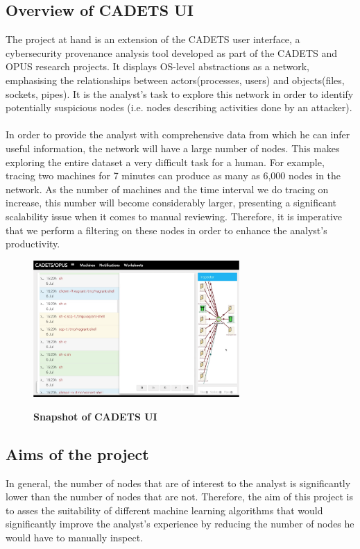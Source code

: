 	\subsection{Overview of CADETS UI}\label{1.1.1}
	The project at hand is an extension of the CADETS user interface, a cybersecurity provenance analysis tool developed as part of the CADETS and OPUS research projects. It displays OS-level abstractions as a network, emphasising the relationships between actors(processes, users) and objects(files, sockets, pipes). It is the analyst's task to explore this network in order to identify potentially suspicious nodes (i.e. nodes describing activities done by an attacker). 
	\\ \\
	In order to provide the analyst with comprehensive data from which he can infer useful information, the network will have a large number of nodes. This makes exploring the entire dataset a very difficult task for a human.  For example, tracing two machines for 7 minutes can produce as many as 6,000 nodes in the network. As the number of machines and the time interval we do tracing on increase, this number will become considerably larger, presenting a significant scalability issue when it comes to manual reviewing. Therefore, it is imperative that we perform a filtering on these nodes in order to enhance the analyst's productivity.
	\begin{figure}[H]
		\centering
		\includegraphics[width=0.7\textwidth]{graphics/CADETS}
		\label{Figure 1.1}
		\caption{\bf Snapshot of CADETS UI}
	\end{figure}
	
	\subsection{Aims of the project}
	In general, the number of nodes that are of interest to the analyst is significantly lower than the number of nodes that are not. Therefore, the aim of this project is to asses the suitability of different machine learning algorithms that would significantly improve the analyst's experience by reducing the number of nodes he would have to manually inspect. 
	
